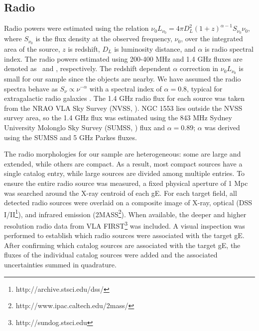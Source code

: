 \documentclass[12pt, preprint]{aastex}
\begin{document}
\subsection{Radio}
\label{sec:radio}

Radio powers were estimated using the relation $\nu_0 L_{\nu_0} = 4
\pi D_L^2 (1+z)^{\alpha-1} S_{\nu_0} \nu_0$, where $S_{\nu_0}$ is the
flux density at the observed frequency, $\nu_0$, over the integrated
area of the source, $z$ is redshift, $D_L$ is luminosity distance, and
$\alpha$ is radio spectral index. The radio powers estimated using
200-400 MHz and 1.4 GHz fluxes are denoted as \plow\ and \phigh,
respectively. The redshift dependent $\alpha$ correction in $\nu_0
L_{\nu_0}$ is small for our sample since the objects are nearby. We
have assumed the radio spectra behave as $S_{\nu} \propto
\nu^{-\alpha}$ with a spectral index of $\alpha = 0.8$, typical for
extragalactic radio galaxies \citep{1992ARA&A..30..575C}. The 1.4 GHz
radio flux for each source was taken from the NRAO VLA Sky Survey
(NVSS, \citealt{nvss}). NGC 1553 lies outside the NVSS survey area, so
the 1.4 GHz flux was estimated using the 843 MHz Sydney University
Molonglo Sky Survey (SUMSS, \citealt{sumss1}) flux and $\alpha =
0.89$; $\alpha$ was derived using the SUMSS and 5 GHz Parkes
\citep{1970ApL.....5...29W} fluxes.

The radio morphologies for our sample are heterogeneous: some are
large and extended, while others are compact. As a result, most
compact sources have a single catalog entry, while large sources are
divided among multiple entries. To ensure the entire radio source was
measured, a fixed physical aperture of 1 Mpc was searched around the
X-ray centroid of each gE. For each target field, all detected radio
sources were overlaid on a composite image of X-ray, optical (DSS
I/II\footnote{http://archive.stsci.edu/dss/}), and infrared emission
(2MASS\footnote{http://www.ipac.caltech.edu/2mass/}). When available,
the deeper and higher resolution radio data from VLA
FIRST\footnote{http://sundog.stsci.edu} was included. A visual
inspection was performed to establish which radio sources were
associated with the target gE. After confirming which catalog sources
are associated with the target gE, the fluxes of the individual
catalog sources were added and the associated uncertainties summed in
quadrature.
\end{document}
